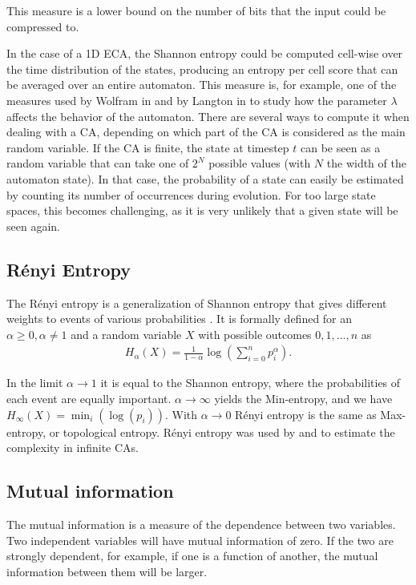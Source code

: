 This measure is a lower bound on the number of bits that the input could be
compressed to.

In the case of a 1D \ac{ECA}, the Shannon entropy could be computed cell-wise
over the time distribution of the states, producing an entropy per cell score
that can be averaged over an entire automaton. This measure is, for example, one
of the measures used by Wolfram in
\parencite{wolframStatisticalMechanicsCellular1983} and by Langton in
\parencite{langtonComputationEdgeChaos1990} to study how the parameter $\lambda$
affects the behavior of the automaton. There are several ways to compute it when
dealing with a CA, depending on which part of the CA is considered as the main
random variable. If the CA is finite, the state at timestep $t$ can be seen as a
random variable that can take one of $2^N$ possible values (with $N$ the width
of the automaton state). In that case, the probability of a state can easily be
estimated by counting its number of occurrences during evolution. For too large
state spaces, this becomes challenging, as it is very unlikely that a given state will
be seen again.

\subsection{Rényi Entropy}
The Rényi entropy is a generalization of Shannon entropy that gives different
weights to events of various probabilities
\parencite{renyiMeasuresEntropyInformation1961}. It is formally defined for an
$\alpha \geq 0, \alpha \neq 1$ and a random variable $X$ with possible outcomes $0, 1, ..., n$ as
\begin{align*}
  H_\alpha(X) = \frac{1}{1-\alpha} \log\left(\sum_{i=0}^np_i^\alpha\right).
\end{align*}

In the limit $\alpha \rightarrow 1$ it is equal to the Shannon entropy, where the probabilities of each event are equally important. $\alpha \rightarrow \infty$ yields the Min-entropy, and we have
$H_{\infty} (X) = \min_{i}(\log(p_{i}))$. With $\alpha \rightarrow 0$ Rényi entropy is the same as
Max-entropy, or topological entropy. Rényi entropy was used by
\textcite{wolframStatisticalMechanicsCellular1983} and
\textcite{lindgrenComplexityMeasuresCellular1988} to estimate the complexity in
infinite \acp{CA}.

\subsection{Mutual information}
The mutual information is a measure of the dependence between two variables. Two
independent variables will have mutual information of zero. If the two are
strongly dependent, for example, if one is a function of another, the mutual
information between them will be larger.


